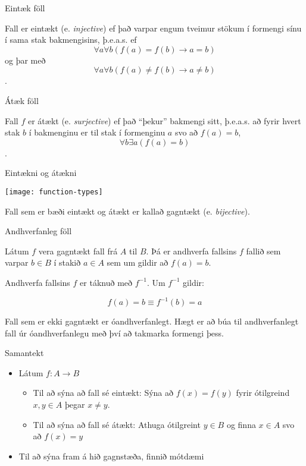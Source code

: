 \documentclass[handout]{beamer}
\begin{document}
\begin{frame}{Eintæk föll}
\begin{tcolorbox}[title=Eintækt fall]
Fall er eintækt (e. \emph{injective}) ef það varpar engum tveimur stökum í formengi sínu í sama stak bakmengisins, þ.e.a.s. ef \[\forall a \forall b (f(a) = f(b) \to a = b)\] og þar með \[\forall a \forall b (f(a) \neq f(b) \to a \neq b)\].
\end{tcolorbox}
\end{frame}

\begin{frame}{Átæk föll}
\begin{tcolorbox}[title=Átækt fall]
Fall $f$ er átækt (e. \emph{surjective}) ef það ``þekur'' bakmengi sitt, þ.e.a.s. að fyrir hvert stak $b$ í bakmenginu er til stak í formenginu $a$ svo að $f(a) = b$, \[\forall b \exists a (f(a) = b)\].
\end{tcolorbox}
\end{frame}

\begin{frame}{Eintækni og átækni}
\begin{center}
\texttt{[image: function-types]}
\end{center}
Fall sem er bæði eintækt og átækt er kallað gagntækt (e. \emph{bijective}).
\end{frame}

\begin{frame}{Andhverfanleg föll}
\begin{tcolorbox}[title=Andhverfanlegt fall]
Látum $f$ vera gagntækt fall frá $A$ til $B$. Þá er andhverfa fallsins $f$ fallið sem varpar $b \in B$ í stakið $a \in A$ sem um gildir að $f(a) = b$.

Andhverfa fallsins $f$ er táknuð með $f^{-1}$. Um $f^{-1}$ gildir:

\[
 f(a) = b \equiv f^{-1}(b) = a
\]

\end{tcolorbox}
Fall sem er ekki gagntækt er óandhverfanlegt. Hægt er að búa til andhverfanlegt fall úr óandhverfanlegu með því að takmarka formengi þess.
\end{frame}

\begin{frame}{Samantekt}
\begin{itemize}
 \item Látum $f: A \to B$
 \begin{itemize}
  \item Til að sýna að fall sé eintækt: Sýna að $f(x) = f(y)$ fyrir ótilgreind $x, y \in A$ þegar $x \neq y$.
  \item Til að sýna að fall sé átækt: Athuga ótilgreint $y \in B$ og finna $x \in A$ svo að $f(x) = y$
 \end{itemize}
 \item Til að sýna fram á hið gagnstæða, finnið mótdæmi
\end{itemize}

\end{frame}
\end{document}
